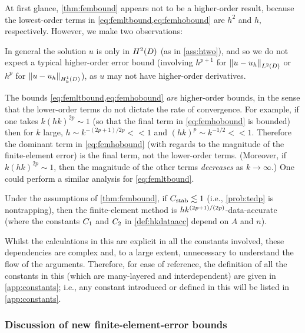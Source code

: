 \label{rem:higherorder}
At first glance, \cref{thm:fembound} appears not to be a higher-order result, because the lowest-order terms in \cref{eq:femltbound,eq:femhobound} are $h^2$ and $h,$  respectively. However, we make two observations:
\ben
\item In general the solution $u$ is only in $\HtD$ (as in \cref{ass:htwo}), and so we do not expect a typical higher-order error bound (involving $h^{p+1}$ for $\NLtD{u-\uh}$ or $h^p$ for $\NHokD{u-\uh}$), as $u$ may not have higher-order derivatives.
  \item The bounds \cref{eq:femltbound,eq:femhobound} \emph{are} higher-order bounds, in the sense that the lower-order terms do not dictate the rate of convergence. For example, if one takes $k(hk)^{2p} \sim 1$ (so that the final term in \cref{eq:femhobound} is bounded) then for $k$ large, $h \sim k^{-(2p+1)/2p} << 1$ and $(hk)^p \sim k^{-1/2} << 1$. Therefore the dominant term in \cref{eq:femhobound} (with regards to the magnitude of the finite-element error) is the final term, not the lower-order terms. (Moreover, if $k(hk)^{2p} \sim 1$, then the magnitude of the other terms \emph{decreases} as $k \rightarrow \infty$.) One could perform a similar analysis for \cref{eq:femltbound}.
\een
\ere

\label{cor:dataacc}
Under the assumptions of \cref{thm:fembound}, if $C_{\mathrm{stab}} \lesssim 1$ (i.e., \cref{prob:tedp} is nontrapping), then the finite-element method is $hk^{(2p+1)/(2p)}$-data-accurate (where the constants $C_{1}$ and $C_{2}$ in \cref{def:hkdataacc} depend on $A$ and $n$).
\eco

Whilst the calculations in this  are explicit in all the constants involved, these dependencies are complex and, to a large extent, unnecessary to understand the flow of the arguments. Therefore, for ease of reference, the definition of all the constants in this  (which are many-layered and interdependent) are given in \cref{app:constants}; i.e., any constant introduced or defined in this  will be listed in \cref{app:constants}.



\subsubsection{Discussion of new finite-element-error bounds}

